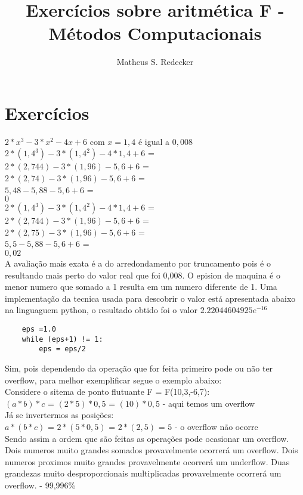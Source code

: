 \documentclass[12pt]{article}
\title{Exercícios sobre aritmética F - Métodos Computacionais}
\author{Matheus S. Redecker\inst{1}}
\begin{document}
 

\maketitle


\section{Exercícios}

    $ 2 * x^{3} - 3 * x^{2} - 4x + 6 $ com $x = 1,4 $ é igual a $0,008$
     \\ $ 2 * (1,4^{3}) - 3 * (1,4^{2}) - 4 * 1,4 + 6  $ = \\ $ 2 * (2,744) - 3 * (1,96) - 5,6 + 6  $ = \\ $2 * (2,74) - 3 * (1,96) - 5,6 + 6  $ = \\ $5,48 - 5,88 - 5,6 + 6 $ = \\ $0$
     \\ $ 2 * (1,4^{3}) - 3 * (1,4^{2}) - 4 * 1,4 + 6  $ = \\ $ 2 * (2,744) - 3 * (1,96) - 5,6 + 6  $ = \\ $2 * (2,75) - 3 * (1,96) - 5,6 + 6  $ = \\ $5,5 - 5,88 - 5,6 + 6 $ = \\ $0,02$\\
A avaliação mais exata é a do arredondamento por truncamento pois é o resultando mais perto do valor real que foi 0,008.
 O epision de maquina é o menor numero que somado a 1 resulta em um numero diferente de 1. Uma implementação da tecnica usada para descobrir o valor está apresentada abaixo na linguaguem python, o resultado obtido foi o valor $2.22044604925 e^{-16} $
\begin{verbatim}
	eps =1.0
	while (eps+1) != 1:
		eps = eps/2
\end{verbatim} 

 Sim, pois dependendo da operação que for feita primeiro pode ou não ter overflow, para melhor exemplificar segue o exemplo abaixo: \\
Considere o sitema de ponto flutuante F = F(10,3,-6,7): \\
$(a * b) * c $ = $(2 * 5) * 0,5$ = $(10)* 0,5$ - aqui temos um overflow \\
Já se invertermos as posições: \\
$a * (b * c)$ = $2 * (5 * 0,5)$ = $2 * (2,5)$ = $ 5 $ - o overflow não ocorre \\
Sendo assim a ordem que são feitas as operações pode ocasionar um overflow.
\newpage
{} 
     Dois numeros muito grandes somados provavelmente ocorrerá um overflow.
     Dois numeros proximos muito grandes provavelmente ocorrerá um underflow.
     Duas grandezas muito desproporcionais multiplicadas provavelmente ocorrerá um overflow.
     -
 99,996\%
\end{document}
